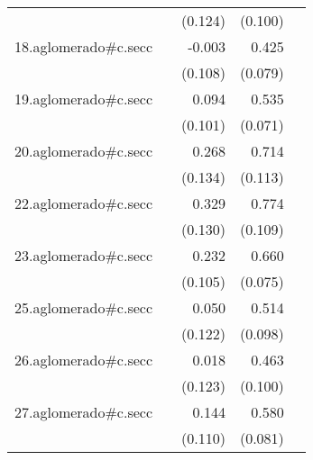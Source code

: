 {\begin{longtable}{l*{4}{D{.}{.}{-1}}}
            &                     &     (0.124)         &     (0.100)         &                     \\
\addlinespace
18.aglomerado#c.secc&                     &      -0.003         &       0.425\sym{***}&                     \\
            &                     &     (0.108)         &     (0.079)         &                     \\
\addlinespace
19.aglomerado#c.secc&                     &       0.094         &       0.535\sym{***}&                     \\
            &                     &     (0.101)         &     (0.071)         &                     \\
\addlinespace
20.aglomerado#c.secc&                     &       0.268\sym{*}  &       0.714\sym{***}&                     \\
            &                     &     (0.134)         &     (0.113)         &                     \\
\addlinespace
22.aglomerado#c.secc&                     &       0.329\sym{*}  &       0.774\sym{***}&                     \\
            &                     &     (0.130)         &     (0.109)         &                     \\
\addlinespace
23.aglomerado#c.secc&                     &       0.232\sym{*}  &       0.660\sym{***}&                     \\
            &                     &     (0.105)         &     (0.075)         &                     \\
\addlinespace
25.aglomerado#c.secc&                     &       0.050         &       0.514\sym{***}&                     \\
            &                     &     (0.122)         &     (0.098)         &                     \\
\addlinespace
26.aglomerado#c.secc&                     &       0.018         &       0.463\sym{***}&                     \\
            &                     &     (0.123)         &     (0.100)         &                     \\
\addlinespace
27.aglomerado#c.secc&                     &       0.144         &       0.580\sym{***}&                     \\
            &                     &     (0.110)         &     (0.081)         &                     \\

\end{longtable}}
